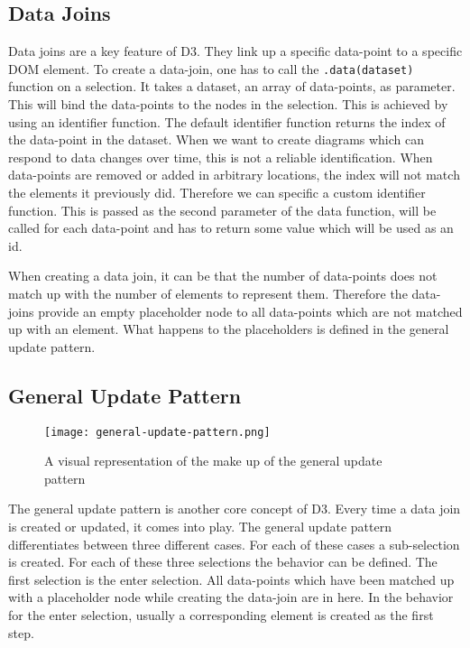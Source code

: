 \subsection{Data Joins}

Data joins are a key feature of D3. They link up a specific data-point to a specific DOM element. To create a data-join, one has to call the \verb|.data(dataset)| function on a selection. It takes a dataset, an array of data-points, as parameter. This will bind the data-points to the nodes in the selection. This is achieved by using an identifier function. The default identifier function returns the index of the data-point in the dataset. When we want to create diagrams which can respond to data changes over time, this is not a reliable identification. When data-points are removed or added in arbitrary locations, the index will not match the elements it previously did. Therefore we can specific a custom identifier function. This is passed as the second parameter of the data function, will be called for each data-point and has to return some value which will be used as an id.

When creating a data join, it can be that the number of data-points does not match up with the number of elements to represent them. Therefore the data-joins provide an empty placeholder node to all data-points which are not matched up with an element. What happens to the placeholders is defined in the general update pattern.

\subsection{General Update Pattern}

\begin{figure}
    \label{fig:general-update-pattern}
    \texttt{[image: general-update-pattern.png]}
    \caption[general-update-pattern]{A visual representation of the make up of the general update pattern\cite{bostock_2012}}
\end{figure}

The general update pattern is another core concept of D3. Every time a data join is created or updated, it comes into play. The general update pattern differentiates between three different cases. For each of these cases a sub-selection is created. For each of these three selections the behavior can be defined. The first selection is the enter selection. All data-points which have been matched up with a placeholder node while creating the data-join are in here. In the behavior for the enter selection, usually a corresponding element is created as the first step.

